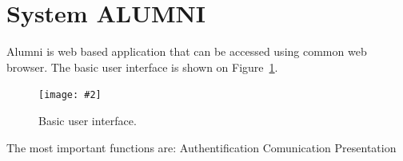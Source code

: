 \documentclass{iitsrc}[2006/14/02]
\newcommand\fig[4]{%
	\begin{figure}[h]
	\begin{center}
	\texttt{[image: \#2]}
	~\\%
	\caption{#4}
	\label{#3}
	\end{center}
	\end{figure}
}
\begin{document}



\section{System ALUMNI}

Alumni is web based application that can be accessed using common web browser. The basic user interface is shown on Figure~\ref{fig:scr1}. 

\fig{width=12cm, bb = 0 0 831 683}{images/screen1.png}{fig:scr1}{Basic user interface.}

The most important functions are:
Authentification
Comunication
Presentation
\end{document}
